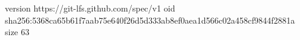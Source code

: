 version https://git-lfs.github.com/spec/v1
oid sha256:5368ca65b61f7aab75e640f26d5d333ab8ef0aea1d566c02a458cf9844f2881a
size 63

